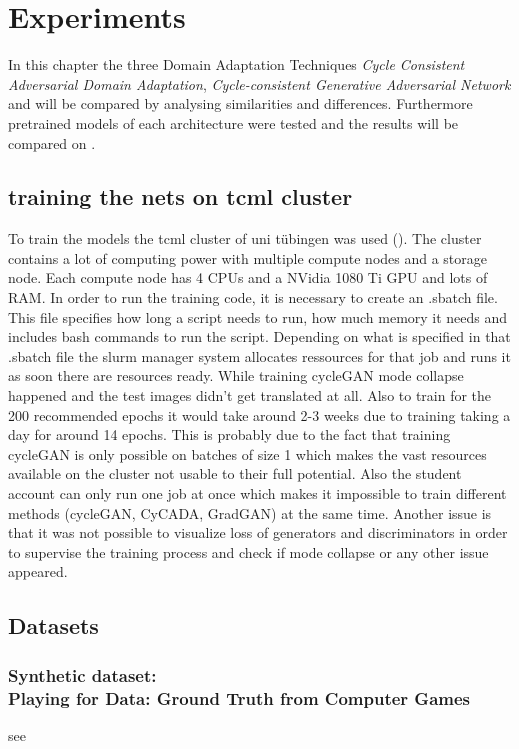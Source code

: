 \chapter{Experiments}
\label{sec:experiments}

In this chapter the three Domain Adaptation Techniques \textit{Cycle Consistent Adversarial Domain Adaptation}, \textit{Cycle-consistent Generative Adversarial Network} and  will be compared by analysing similarities and differences. Furthermore pretrained models of each architecture were tested and the results will be compared on .

\section{training the nets on tcml cluster} 
To train the models the tcml cluster of uni tübingen was used (). The cluster contains a lot of computing power with multiple compute nodes and a storage node. Each compute node has 4 CPUs and a NVidia 1080 Ti GPU and lots of RAM. In order to run the training code, it is necessary to create an .sbatch file. This file specifies how long a script needs to run, how much memory it needs and includes bash commands to run the script. Depending on what is specified in that .sbatch file the slurm manager system allocates ressources for that job and runs it as soon there are resources ready. While training cycleGAN mode collapse happened and the test images didn't get translated at all. Also to train for the 200 recommended epochs it would take around 2-3 weeks due to training taking a day for around 14 epochs. This is probably due to the fact that training cycleGAN is only possible on batches of size 1 which makes the vast resources available on the cluster not usable to their full potential. Also the student account can only run one job at once which makes it impossible to train different methods (cycleGAN, CyCADA, GradGAN) at the same time. Another issue is that it was not possible to visualize loss of generators and discriminators in order to supervise the training process and check if mode collapse or any other issue appeared. 

\section{Datasets}

\subsection{Synthetic dataset: \\
	Playing for Data: Ground Truth from Computer Games}
see \cite{Richter_2016_ECCV}

